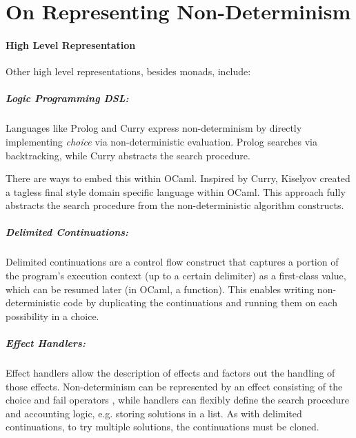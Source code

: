 \chapter{On Representing Non-Determinism}
\label{sec:NonDeterminismAppendix}

\subsubsection{High Level Representation}
Other high level representations, besides monads, include:

\paragraph{Logic Programming DSL:} Languages like Prolog \cite{Prolog} and Curry \cite{CurryLang} express non-determinism by directly implementing \textit{choice} via non-deterministic evaluation. Prolog searches via backtracking, while Curry abstracts the search procedure.

There are ways to embed this within OCaml. Inspired by Curry, Kiselyov \cite{NondetDSL} created a tagless final style \cite{TaglessFinalDSL} domain specific language within OCaml. This approach fully abstracts the search procedure from the non-deterministic algorithm constructs.
\paragraph{Delimited Continuations:} Delimited continuations \cite{DelimitedControl, ShiftReset} are a control flow construct that captures a portion of the program's execution context (up to a certain delimiter) as a first-class value, which can be resumed later (in OCaml, a function). This enables writing non-deterministic code by duplicating the continuations and running them on each possibility in a choice.

\paragraph{Effect Handlers:} Effect handlers allow the description of effects and factors out the handling of those effects. Non-determinism can be represented by an effect consisting of the choice and fail operators \cite{EffectsExamples, HandlersInAction}, while handlers can flexibly define the search procedure and accounting logic, e.g. storing solutions in a list. As with delimited continuations, to try multiple solutions, the {continuations} must be cloned.


